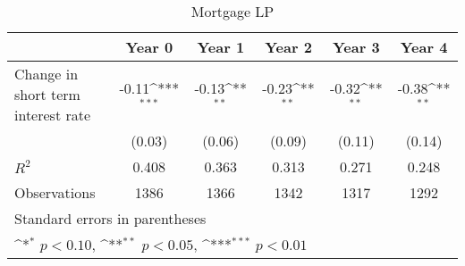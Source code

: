 \documentclass{article}
\begin{document}
\begin{table}[htbp]\centering
\def\sym#1{\ifmmode^{#1}\else\(^{#1}\)\fi}
\caption{Mortgage LP}
\begin{tabular}{l*{5}{c}}
\hline\hline
                    &\multicolumn{1}{c}{Year 0}&\multicolumn{1}{c}{Year 1}&\multicolumn{1}{c}{Year 2}&\multicolumn{1}{c}{Year 3}&\multicolumn{1}{c}{Year 4}\\
\hline
Change in short term interest rate&       -0.11\sym{***}&       -0.13\sym{**} &       -0.23\sym{**} &       -0.32\sym{**} &       -0.38\sym{**} \\
                    &      (0.03)         &      (0.06)         &      (0.09)         &      (0.11)         &      (0.14)         \\
\hline
\(R^{2}\)           &       0.408         &       0.363         &       0.313         &       0.271         &       0.248         \\
Observations        &        1386         &        1366         &        1342         &        1317         &        1292         \\
\hline\hline
\multicolumn{6}{l}{\footnotesize Standard errors in parentheses}\\
\multicolumn{6}{l}{\footnotesize \sym{*} \(p<0.10\), \sym{**} \(p<0.05\), \sym{***} \(p<0.01\)}\\
\end{tabular}
\end{table}
\end{document}
